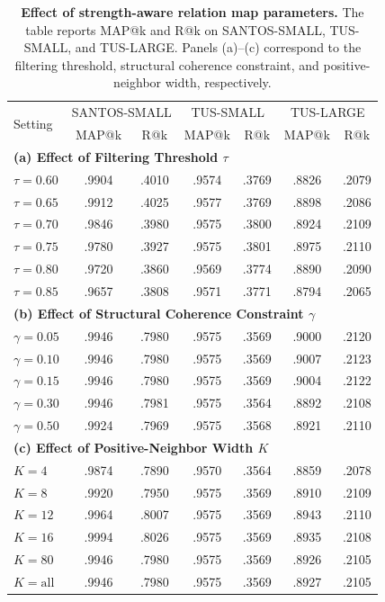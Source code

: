 \begin{table}[t]
\centering
\caption{\textbf{Effect of strength-aware relation map parameters.}
The table reports MAP@k and R@k on SANTOS-SMALL, TUS-SMALL, and TUS-LARGE.
Panels (a)--(c) correspond to the filtering threshold, structural coherence constraint, and positive-neighbor width, respectively.}
\label{tab:relationmap_parameter_effects}
\footnotesize
\setlength{\tabcolsep}{4pt}
\renewcommand{\arraystretch}{0.92}
\begin{tabular}{l|cc|cc|cc}
\toprule
\multirow{2}{*}{Setting}
& \multicolumn{2}{c|}{SANTOS-SMALL}
& \multicolumn{2}{c|}{TUS-SMALL}
& \multicolumn{2}{c}{TUS-LARGE} \\
& MAP@k & R@k & MAP@k & R@k & MAP@k & R@k \\
\midrule
\multicolumn{7}{l}{\textbf{(a) Effect of Filtering Threshold  \(\tau\)}} \\
\midrule
\(\tau=0.60\) & .9904 & .4010 & .9574 & .3769 & .8826 & .2079 \\
\(\tau=0.65\) & .9912 & .4025 & .9577 & .3769 & .8898 & .2086 \\
\(\tau=0.70\) & .9846 & .3980 & .9575 & .3800 & .8924 & .2109 \\
\(\tau=0.75\) & .9780 & .3927 & .9575 & .3801 & .8975 & .2110 \\
\(\tau=0.80\) & .9720 & .3860 & .9569 & .3774 & .8890 & .2090 \\
\(\tau=0.85\) & .9657 & .3808 & .9571 & .3771 & .8794 & .2065 \\
\midrule
\multicolumn{7}{l}{\textbf{(b) Effect of Structural Coherence Constraint \(\gamma\)}} \\
\midrule
\(\gamma=0.05\) & .9946 & .7980 & .9575 & .3569 & .9000 & .2120 \\
\(\gamma=0.10\) & .9946 & .7980 & .9575 & .3569 & .9007 & .2123 \\
\(\gamma=0.15\) & .9946 & .7980 & .9575 & .3569 & .9004 & .2122 \\
\(\gamma=0.30\) & .9946 & .7981 & .9575 & .3564 & .8892 & .2108 \\
\(\gamma=0.50\) & .9924 & .7969 & .9575 & .3568 & .8921 & .2110 \\
\midrule
\multicolumn{7}{l}{\textbf{(c) Effect of Positive-Neighbor Width \(K\)}} \\
\midrule
\(K=4\)   & .9874 & .7890 & .9570 & .3564 & .8859 & .2078 \\
\(K=8\)   & .9920 & .7950 & .9575 & .3569 & .8910 & .2109 \\
\(K=12\)  & .9964 & .8007 & .9575 & .3569 & .8943 & .2110 \\
\(K=16\)  & .9994 & .8026 & .9575 & .3569 & .8935 & .2108 \\
\(K=80\)  & .9946 & .7980 & .9575 & .3569 & .8926 & .2105 \\
\(K=\mathrm{all}\) & .9946 & .7980 & .9575 & .3569 & .8927 & .2105 \\
\bottomrule
\end{tabular}
\end{table}
